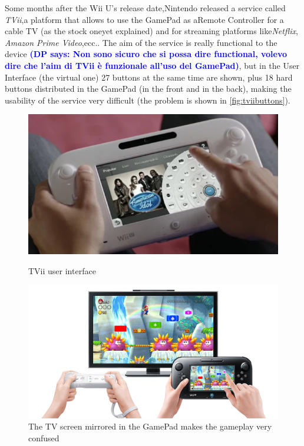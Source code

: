 \documentclass[11pt,a4paper,titlepage]{article}
\newcommand{\DP}[1]{\textcolor{blue}{\textbf{(DP says: #1)}}}
\begin{document}
			Some months after the Wii U's release date,Nintendo released a service called \textit{TVii},a platform that allows to use the GamePad as aRemote Controller for a cable TV (as the stock oneyet explained) and for streaming platforms like\textit{Netflix}, \textit{Amazon Prime Video},ecc..
			The aim of the service is really functional to the device \DP{Non sono sicuro che si possa dire functional, volevo dire che l'aim di TVii è funzionale all'uso del GamePad}, but in the User Interface (the virtual one) 27 buttons at the same time are shown, plus 18 hard buttons distributed in the GamePad (in the front and in the back), making the usability of the service very difficult (the problem is shown in \autoref{fig:tviibuttons}).
			\begin{figure}[htbp]
				\begin{minipage}{.5\textwidth}
					\includegraphics[width=\textwidth]{TViibuttons.png}
					\caption{TVii user interface}
					\label{fig:tviibuttons}
				\end{minipage}
				\begin{minipage}{.5\textwidth}
					\includegraphics[width=\textwidth]{mariobrosu.jpeg}
					\caption{The TV screen mirrored in the GamePad makes the gameplay very confused}
					\label{fig:mariobros_u}
				\end{minipage}
			\end{figure}
\end{document}
